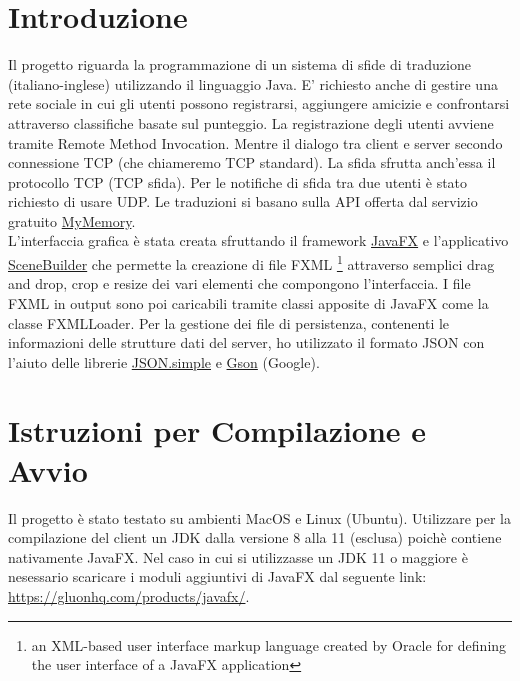 \documentclass{article}
\begin{document}
\section{Introduzione}
Il progetto riguarda la programmazione di un sistema di sfide di traduzione (italiano-inglese) utilizzando il linguaggio Java. E' richiesto anche di gestire una rete sociale in cui gli utenti possono registrarsi, aggiungere amicizie e confrontarsi attraverso classifiche basate sul punteggio. La registrazione degli utenti avviene tramite Remote Method Invocation. Mentre il dialogo tra client e server secondo connessione TCP (che chiameremo TCP standard). La sfida sfrutta anch'essa il protocollo TCP (TCP sfida). Per le notifiche di sfida tra due utenti è stato richiesto di usare UDP. Le traduzioni si basano sulla API offerta dal servizio gratuito \href{https://mymemory.translated.net/doc/spec.php}{MyMemory}. \\
L'interfaccia grafica è stata creata sfruttando il framework \href{https://docs.oracle.com/javase/8/javafx/get-started-tutorial/jfx-overview.htm}{JavaFX} e l'applicativo \href{https://gluonhq.com/products/scene-builder/}{SceneBuilder} che permette la creazione di file FXML \footnote{an XML-based user interface markup language created by Oracle for defining the user interface of a JavaFX application} attraverso semplici drag and drop, crop e resize dei vari elementi che compongono l'interfaccia. I file FXML in output sono poi caricabili tramite classi apposite di JavaFX come la classe FXMLLoader. Per la gestione dei file di persistenza, contenenti le informazioni delle strutture dati del server, ho utilizzato il formato JSON con l'aiuto delle librerie \href{https://code.google.com/archive/p/json-simple/}{JSON.simple} e \href{https://github.com/google/gson/blob/master/UserGuide.md}{Gson} (Google).

\section{Istruzioni per Compilazione e Avvio}
Il progetto è stato testato su ambienti MacOS e Linux (Ubuntu). Utilizzare per la compilazione del client un JDK dalla versione 8 alla 11 (esclusa) poichè contiene nativamente JavaFX. Nel caso in cui si utilizzasse un JDK 11 o maggiore è nesessario scaricare i moduli aggiuntivi di JavaFX dal seguente link: \href{https://gluonhq.com/products/javafx/}{https://gluonhq.com/products/javafx/}. \newline 
\end{document}
